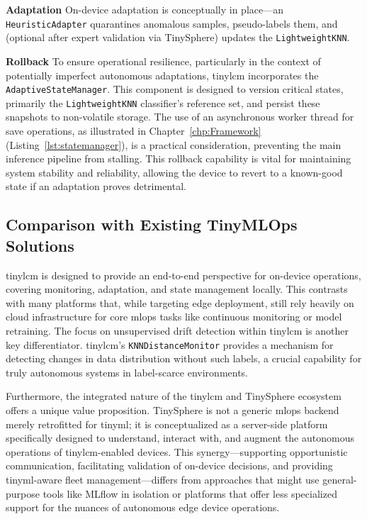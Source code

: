 \textbf{Adaptation} \quad
On-device adaptation is conceptually in place—an \texttt{HeuristicAdapter} quarantines anomalous samples, pseudo-labels them, and (optional after expert validation via TinySphere) updates the \texttt{LightweightKNN}.  

\textbf{Rollback} \quad
To ensure operational resilience, particularly in the context of potentially imperfect autonomous adaptations, \gls{tinylcm} incorporates the \texttt{AdaptiveStateManager}. This component is designed to version critical states, primarily the \texttt{LightweightKNN} classifier's reference set, and persist these snapshots to non-volatile storage. The use of an asynchronous worker thread for save operations, as illustrated in Chapter~\ref{chp:Framework} (Listing~\ref{lst:statemanager}), is a practical consideration, preventing the main inference pipeline from stalling. This rollback capability is vital for maintaining system stability and reliability, allowing the device to revert to a known-good state if an adaptation proves detrimental.

\subsection{Comparison with Existing TinyMLOps Solutions}
\label{ssec:comparison_existing_solutions}

\Gls{tinylcm} is designed to provide an end-to-end perspective for on-device operations, covering monitoring, adaptation, and state management locally. This contrasts with many platforms that, while targeting edge deployment, still rely heavily on cloud infrastructure for core \gls{mlops} tasks like continuous monitoring or model retraining. 
The focus on unsupervised drift detection within \gls{tinylcm} is another key differentiator. \Gls{tinylcm}'s \texttt{KNNDistanceMonitor} provides a mechanism for detecting changes in data distribution without such labels, a crucial capability for truly autonomous systems in label-scarce environments.

Furthermore, the integrated nature of the \gls{tinylcm} and TinySphere ecosystem offers a unique value proposition. TinySphere is not a generic \gls{mlops} backend merely retrofitted for \gls{tinyml}; it is conceptualized as a server-side platform specifically designed to understand, interact with, and augment the autonomous operations of \gls{tinylcm}-enabled devices. This synergy—supporting opportunistic communication, facilitating validation of on-device decisions, and providing \gls{tinyml}-aware fleet management—differs from approaches that might use general-purpose tools like MLflow in isolation or platforms that offer less specialized support for the nuances of autonomous edge device operations.

